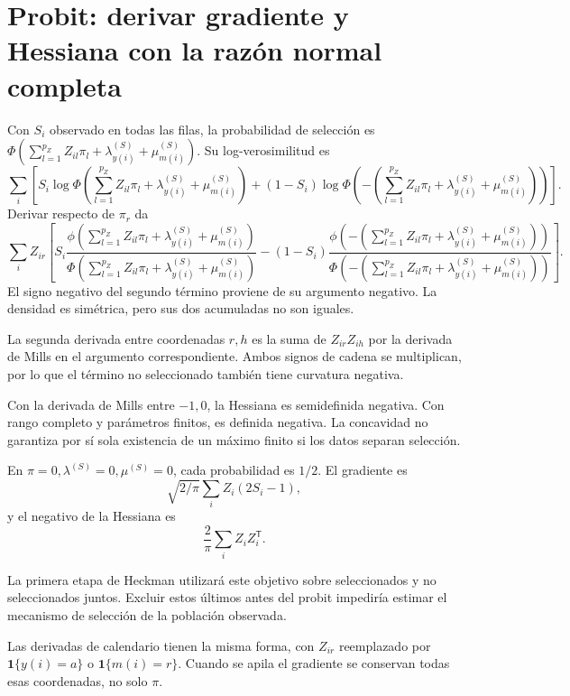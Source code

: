 \documentclass[11pt,a4paper]{article}
\newcommand{\T}{^{\mathsf T}}
\begin{document}
\clearpage
\section{Probit: derivar gradiente y Hessiana con la razón normal completa}

Con \(S_i\) observado en todas las filas,
la probabilidad de selección es
\(\Phi(\sum_{l=1}^{p_Z}Z_{il}\pi_l+\lambda_{y(i)}^{(S)}+\mu_{m(i)}^{(S)})\).
Su log-verosimilitud es
\[
\sum_i\left[
S_i\log\Phi(\sum_{l=1}^{p_Z}Z_{il}\pi_l+\lambda_{y(i)}^{(S)}+\mu_{m(i)}^{(S)})
+(1-S_i)\log\Phi(-\left(\sum_{l=1}^{p_Z}Z_{il}\pi_l+\lambda_{y(i)}^{(S)}+\mu_{m(i)}^{(S)}\right))\right].
\]
Derivar respecto de \(\pi_r\) da
\[
\sum_i Z_{ir}\left[
S_i\frac{\phi(\sum_{l=1}^{p_Z}Z_{il}\pi_l+\lambda_{y(i)}^{(S)}+\mu_{m(i)}^{(S)})}
{\Phi(\sum_{l=1}^{p_Z}Z_{il}\pi_l+\lambda_{y(i)}^{(S)}+\mu_{m(i)}^{(S)})}
-(1-S_i)\frac{\phi(-\left(\sum_{l=1}^{p_Z}Z_{il}\pi_l+\lambda_{y(i)}^{(S)}+\mu_{m(i)}^{(S)}\right))}
{\Phi(-\left(\sum_{l=1}^{p_Z}Z_{il}\pi_l+\lambda_{y(i)}^{(S)}+\mu_{m(i)}^{(S)}\right))}
\right].
\]
El signo negativo del segundo término
proviene de su argumento negativo.
La densidad es simétrica,
pero sus dos acumuladas no son iguales.

La segunda derivada entre coordenadas \(r,h\)
es la suma de \(Z_{ir}Z_{ih}\)
por la derivada de Mills
en el argumento correspondiente.
Ambos signos de cadena se multiplican,
por lo que el término no seleccionado
también tiene curvatura negativa.

Con la derivada de Mills entre \(-1,0\),
la Hessiana es semidefinida negativa.
Con rango completo y parámetros finitos,
es definida negativa.
La concavidad no garantiza por sí sola
existencia de un máximo finito
si los datos separan selección.

\begin{ejemplo}
En \(\pi=0,\lambda^{(S)}=0,\mu^{(S)}=0\), cada probabilidad es \(1/2\).
El gradiente es
\[
\sqrt{2/\pi}\sum_i Z_i(2S_i-1),
\]
y el negativo de la Hessiana es
\[
\frac2\pi\sum_i Z_iZ_i\T.
\]
\end{ejemplo}
La primera etapa de Heckman utilizará
este objetivo sobre seleccionados
y no seleccionados juntos.
Excluir estos últimos antes del probit
impediría estimar el mecanismo
de selección de la población observada.


Las derivadas de calendario tienen la misma forma, con $Z_{ir}$ reemplazado por
$\mathbf1\{y(i)=a\}$ o $\mathbf1\{m(i)=r\}$. Cuando se apila el gradiente se conservan todas esas coordenadas, no solo $\pi$.
\end{document}
